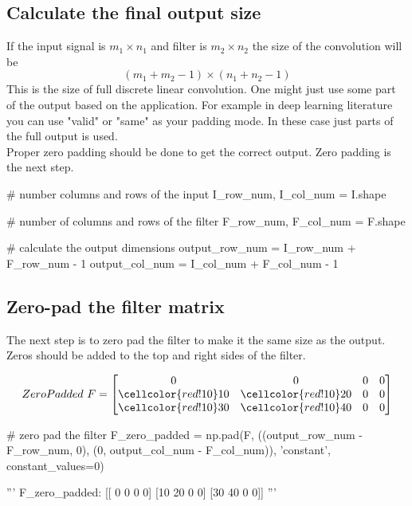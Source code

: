 \documentclass[11pt]{article}
\newcommand\x{\cellcolor{red!10}}
\begin{document}
	\subsection{Calculate the final output size} \label{output_size}
	If the input signal is $m_1 \times n_1$ and filter is $m_2 \times n_2$ the size of the convolution will be 
	$$
	(m_1 + m_2 -1) \times (n_1 + n_2 -1)
	$$
	This is the size of full discrete linear convolution. One might just use some part of the output based on the application. For example in deep learning literature you can use "valid" or "same" as your padding mode. In these case just parts of the full output is used.\\
	Proper zero padding should be done to get the correct output. Zero padding is the next step.   
	
	\vspace{10mm}
	\begin{python}
		# number columns and rows of the input 
		I_row_num, I_col_num = I.shape 
		
		# number of columns and rows of the filter
		F_row_num, F_col_num = F.shape
		
		
		#  calculate the output dimensions
		output_row_num = I_row_num + F_row_num - 1
		output_col_num = I_col_num + F_col_num - 1         
	\end{python}
	\vspace{10mm}
	
	\subsection{Zero-pad the filter matrix}
	The next step is to zero pad the filter to make it the same size as the output. Zeros should be added to the top and right sides of the filter.
	
		\begin{equation}
		ZeroPadded \ F=
		\begin{bmatrix}
		 0 &  0 &  0 &  0\\
		\x 10 & \x 20 &  0 &  0\\
		\x 30 & \x 40 &  0 &  0\\
		\end{bmatrix}
		\end{equation}
	
	\vspace{10mm}
	\begin{python}
 # zero pad the filter
 F_zero_padded = np.pad(F, ((output_row_num - F_row_num, 0),
                           (0, output_col_num - F_col_num)),
                        'constant', constant_values=0)

 '''                       
 F_zero_padded:
 [[ 0  0  0  0]
 [10 20  0  0]
 [30 40  0  0]]
 '''
 
	\end{python}
	\vspace{10mm}
	
\end{document}
